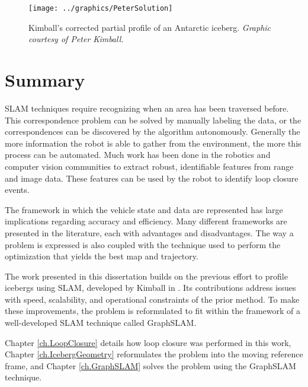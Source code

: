  \begin{figure}[!htb]
   \centering
   \texttt{[image: ../graphics/PeterSolution]} %
   \caption{Kimball's corrected partial profile of an Antarctic iceberg. \emph{Graphic courtesy of Peter Kimball.}}
   \label{fig:KimballSolution}
\end{figure}

\section{Summary}

SLAM techniques require recognizing when an area has been traversed before. This correspondence problem can be solved by manually labeling the data, or the correspondences can be discovered by the algorithm autonomously. Generally the more information the robot is able to gather from the environment, the more this process can be automated. Much work has been done in the robotics and computer vision communities to extract robust, identifiable features from range and image data. These features can be used by the robot to identify loop closure events. 

The framework in which the vehicle state and data are represented has large implications regarding accuracy and efficiency. Many different frameworks are presented in the literature, each with advantages and disadvantages. The way a problem is expressed is also coupled with the technique used to perform the optimization that yields the best map and trajectory.

The work presented in this dissertation builds on the previous effort to profile icebergs using SLAM, developed by Kimball in \cite{Kimball2011b}. Its contributions address issues with speed, scalability, and operational constraints of the prior method. To make these improvements, the problem is reformulated to fit within the framework of a well-developed SLAM technique called GraphSLAM. 

Chapter \ref{ch.LoopClosure} details how loop closure was performed in this work, Chapter \ref{ch.IcebergGeometry} reformulates the problem into the moving reference frame, and Chapter  \ref{ch.GraphSLAM} solves the problem using the GraphSLAM technique.

